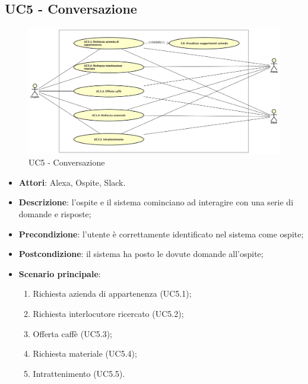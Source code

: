 \documentclass[../AnalisiDeiRequisiti_v3.0.0.tex]{subfiles}
\begin{document}
\subsection{UC5 - Conversazione} 
\label{sssec:UC5}
\begin{figure}[!h]
	\centering
	\includegraphics[width=\textwidth]{UseCases/UC5_Conversazione/UC5_Conversazione.png}
	\caption{UC5 - Conversazione}
\end{figure}
\begin{itemize} 
\item \textbf{Attori}: Alexa, Ospite, Slack.
\item \textbf{Descrizione}: l'ospite e il sistema cominciano ad interagire con una serie di domande e risposte;
\item \textbf{Precondizione}: l'utente è correttamente identificato nel sistema come ospite;
\item \textbf{Postcondizione}: il sistema ha posto le dovute domande all'ospite;
\item \textbf{Scenario principale}: \begin{enumerate}\item Richiesta azienda di appartenenza (UC5.1);\item Richiesta interlocutore ricercato (UC5.2);\item Offerta caffè (UC5.3);\item Richiesta materiale (UC5.4);\item Intrattenimento (UC5.5). 
 \end{enumerate}
\end{itemize} 
\end{document}
